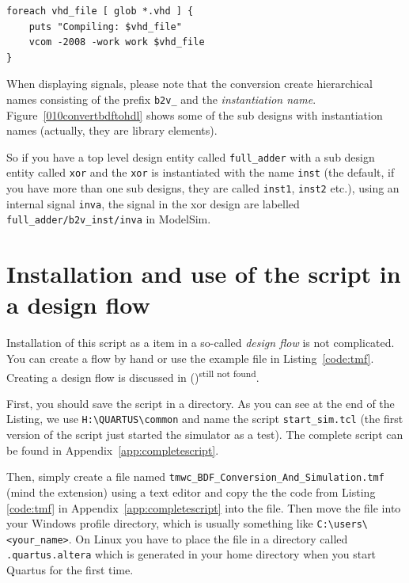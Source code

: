 \documentclass[11pt,a4paper,final,oneside,titlepage,fleqn]{article}
\begin{document}
\begin{lstlisting}[language=tclfix,caption=Including all VHDL Files in a Modelsim Command File.,label=code:modcommand]
foreach vhd_file [ glob *.vhd ] {
	puts "Compiling: $vhd_file"
	vcom -2008 -work work $vhd_file
}
\end{lstlisting}

When displaying signals, please note that the conversion create hierarchical
names consisting of the prefix \texttt{b2v\_} and
the \textit{instantiation name}. Figure~\ref{010convertbdftohdl} shows some
of the sub designs  with  instantiation names (actually, they are library
elements).

So if you have a top level design entity called \texttt{full\_adder} with
a sub design entity called \texttt{xor} and the \texttt{xor} is instantiated
with the name \texttt{inst} (the default, if you have more than one sub designs,
they are called \texttt{inst1}, \texttt{inst2} etc.), using an internal signal
\texttt{inva}, the signal in the xor design are labelled
\texttt{full\_adder/b2v\_inst/inva} in ModelSim. 

\section{Installation and use of the script in a design flow}
\label{sec:installation}
Installation of this script as a item in a so-called \textit{ design flow}
is not complicated. You can create a flow by hand or use the example file
in Listing~\ref{code:tmf}.
Creating a design flow is discussed in ()\textsuperscript{still not found}.

First, you should save the script in a directory. As you can see at the end
of the Listing, we use
\texttt{H:{\textbackslash}QUARTUS{\textbackslash}common} and name the
script \texttt{start\_sim.tcl} (the first version of the script just
started the simulator as a test). The complete script can be found
in Appendix~\ref{app:completescript}.

Then, simply create a file named \texttt{tmwc\_BDF\_Conversion\_And\_Simulation.tmf}
(mind the extension) using a text editor and copy the the code from Listing
\ref{code:tmf} in Appendix~\ref{app:completescript} into the file. Then move
the file into your Windows profile
directory, which is usually something like 
\texttt{C:{\textbackslash}users{\textbackslash}<your\_name>}.
On Linux you have to place the file in a directory called
\texttt{.quartus.altera} which is generated in
your home directory when you start Quartus for the first time.
\end{document}
